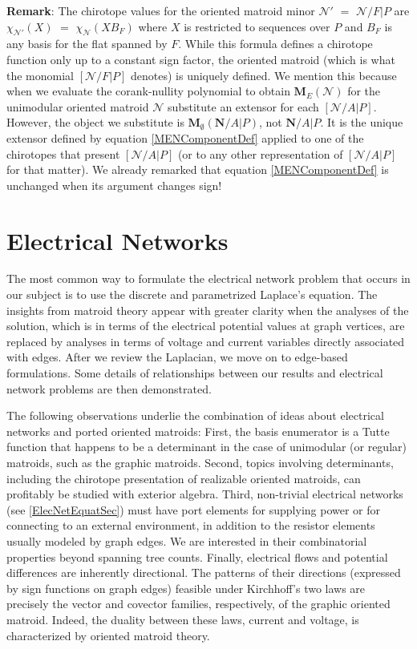 \documentclass[12pt]{article}
\theoremstyle{definition}
\newcommand{\Remark}{\textbf{Remark}}
\newcommand{\ext}[1]{\ensuremath{\mathbf{#1}}}
\begin{document}
\Remark: The chirotope values for the oriented matroid minor
$\mathcal{N}'$ $=$ $\mathcal{N}/ F|P$ are
$\chi_{\mathcal{N}'}(X)$
$=$ $\chi_{\mathcal{N}}(XB_F)$ where $X$ is restricted to sequences
over $P$ and 
$B_F$ is any basis for the flat spanned by $F$.
While this formula
defines a chirotope function 
only up to a constant sign factor, the oriented matroid (which is what
the monomial $[\mathcal{N}/F|P]$ denotes) is uniquely defined.  We mention
this because when we evaluate the corank-nullity polynomial to obtain
$\ext{M}_E(\mathcal{N})$ for the unimodular oriented matroid 
$\mathcal{N}$
substitute an extensor 
for each $[\mathcal{N}/A|P]$.  
However, the object we
substitute is $\ext{M}_\emptyset(\ext{N}/A|P)$,
not $\ext{N}/A|P$.  It is the unique extensor defined by equation 
\eqref{MENComponentDef} applied to one of the chirotopes
that present $[\mathcal{N}/A|P]$ (or to any other representation
of $[\mathcal{N}/A|P]$ for that matter).  We already remarked that equation 
\eqref{MENComponentDef} is unchanged
when its argument changes sign!



\section{Electrical Networks}
\label{ENets}
The most common way to formulate the electrical network problem 
that occurs in our subject is to use the discrete and parametrized
Laplace's equation.  The insights from matroid theory appear 
with greater clarity when the analyses of the solution, which is
in terms of the electrical potential values at graph vertices, are 
replaced by analyses in terms of voltage and current variables 
directly associated with edges.  After we review the Laplacian,
we move on to edge-based formulations.  Some details of relationships
between our results and electrical network problems are then demonstrated.

The following observations underlie the combination of ideas
about electrical networks and ported oriented matroids:
First, the basis enumerator is a Tutte function that 
happens to be a determinant in the case of unimodular 
(or regular) matroids, such as the graphic matroids.
Second, topics involving determinants, including the
chirotope presentation of realizable oriented matroids,
can profitably be studied with exterior algebra.  
Third,
non-trivial electrical networks (see \textsection \ref{ElecNetEquatSec}) 
must have port elements 
for supplying power or for connecting to an external environment,
in addition to the resistor elements usually modeled by
graph edges.  We are interested in their combinatorial 
properties beyond spanning tree 
counts\cite{sdcMTT,sdcBDIMatroid,sdcELEW,sdcPorted,sdcISCAS95,sdcOMP,sdcISCAS98}.
Finally, electrical flows and potential differences
are inherently directional.  The patterns of their directions
(expressed by sign functions on graph edges)
feasible under Kirchhoff's two laws are precisely the 
vector and covector families, respectively, of the graphic 
oriented matroid.  Indeed, the duality between these laws, current
and voltage, is characterized by oriented matroid theory.
\end{document}
